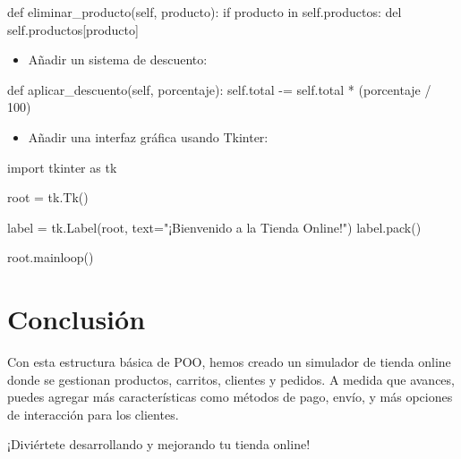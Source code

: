 \documentclass[
  a4paper,
  DIV=11,
  numbers=noendperiod,
  onepage,
  openany]{scrreprt}
\newenvironment{Shaded}{\begin{snugshade}}{\end{snugshade}}
\newcommand{\ControlFlowTok}[1]{\textcolor[rgb]{0.00,0.23,0.31}{#1}}
\newcommand{\DecValTok}[1]{\textcolor[rgb]{0.68,0.00,0.00}{#1}}
\newcommand{\ImportTok}[1]{\textcolor[rgb]{0.00,0.46,0.62}{#1}}
\newcommand{\KeywordTok}[1]{\textcolor[rgb]{0.00,0.23,0.31}{#1}}
\newcommand{\NormalTok}[1]{\textcolor[rgb]{0.00,0.23,0.31}{#1}}
\newcommand{\OperatorTok}[1]{\textcolor[rgb]{0.37,0.37,0.37}{#1}}
\newcommand{\StringTok}[1]{\textcolor[rgb]{0.13,0.47,0.30}{#1}}
\newcommand{\VariableTok}[1]{\textcolor[rgb]{0.07,0.07,0.07}{#1}}
\providecommand{\tightlist}{%
  \setlength{\itemsep}{0pt}\setlength{\parskip}{0pt}}\usepackage{longtable,booktabs,array}
\begin{document}
\begin{Shaded}
\begin{Highlighting}[]
\KeywordTok{def}\NormalTok{ eliminar\_producto(}\VariableTok{self}\NormalTok{, producto):}
    \ControlFlowTok{if}\NormalTok{ producto }\KeywordTok{in} \VariableTok{self}\NormalTok{.productos:}
        \KeywordTok{del} \VariableTok{self}\NormalTok{.productos[producto]}
\end{Highlighting}
\end{Shaded}

\begin{itemize}
\tightlist
\item
  Añadir un sistema de descuento:
\end{itemize}

\begin{Shaded}
\begin{Highlighting}[]
\KeywordTok{def}\NormalTok{ aplicar\_descuento(}\VariableTok{self}\NormalTok{, porcentaje):}
    \VariableTok{self}\NormalTok{.total }\OperatorTok{{-}=} \VariableTok{self}\NormalTok{.total }\OperatorTok{*}\NormalTok{ (porcentaje }\OperatorTok{/} \DecValTok{100}\NormalTok{)}
\end{Highlighting}
\end{Shaded}

\begin{itemize}
\tightlist
\item
  Añadir una interfaz gráfica usando Tkinter:
\end{itemize}

\begin{Shaded}
\begin{Highlighting}[]
\ImportTok{import}\NormalTok{ tkinter }\ImportTok{as}\NormalTok{ tk}

\NormalTok{root }\OperatorTok{=}\NormalTok{ tk.Tk()}

\NormalTok{label }\OperatorTok{=}\NormalTok{ tk.Label(root, text}\OperatorTok{=}\StringTok{"¡Bienvenido a la Tienda Online!"}\NormalTok{)}
\NormalTok{label.pack()}

\NormalTok{root.mainloop()}
\end{Highlighting}
\end{Shaded}

\chapter{Conclusión}\label{conclusiuxf3n-4}

Con esta estructura básica de POO, hemos creado un simulador de tienda
online donde se gestionan productos, carritos, clientes y pedidos. A
medida que avances, puedes agregar más características como métodos de
pago, envío, y más opciones de interacción para los clientes.

¡Diviértete desarrollando y mejorando tu tienda online! 🚀
\end{document}
